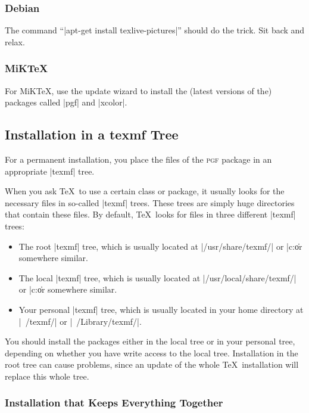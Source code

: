 \subsubsection{Debian}

The command ``|apt-get install texlive-pictures|'' should do the trick.
Sit back and relax.


\subsubsection{MiKTeX}

For MiK\TeX, use the update wizard to install the (latest versions of the)
packages called |pgf| and |xcolor|.


\subsection{Installation in a texmf Tree}

For a permanent installation, you place the files of the \textsc{pgf} package
in an appropriate |texmf| tree.

When you ask \TeX\ to use a certain class or package, it usually looks for the
necessary files in so-called |texmf| trees. These trees are simply huge
directories that contain these files. By default, \TeX\ looks for files in
three different |texmf| trees:
%
\begin{itemize}
    \item The root |texmf| tree, which is usually located at
        |/usr/share/texmf/| or |c:\texmf\| or somewhere similar.
    \item The local  |texmf| tree, which is usually located at
        |/usr/local/share/texmf/| or |c:\localtexmf\| or somewhere similar.
    \item Your personal  |texmf| tree, which is usually located in your home
        directory at |~/texmf/| or |~/Library/texmf/|.
\end{itemize}

You should install the packages either in the local tree or in your personal
tree, depending on whether you have write access to the local tree.
Installation in the root tree can cause problems, since an update of the whole
\TeX\ installation will replace this whole tree.


\subsubsection{Installation that Keeps Everything Together}

